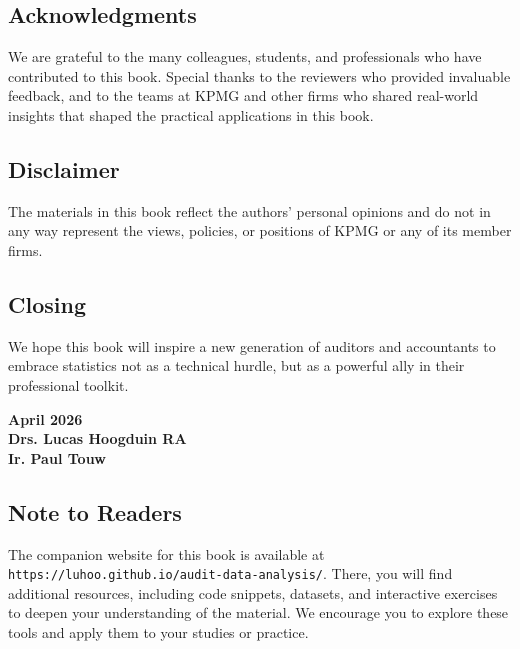 \documentclass[11pt]{memoir}
\theoremstyle{definition} %
\begin{document}
\subsection*{Acknowledgments}
We are grateful to the many colleagues, students, and professionals who have contributed to this book. Special thanks to the reviewers who provided invaluable feedback, and to the teams at KPMG and other firms who shared real-world insights that shaped the practical applications in this book.

\subsection*{Disclaimer}
The materials in this book reflect the authors' personal opinions and do not in any way represent the views, policies, or positions of KPMG or any of its member firms.

\subsection*{Closing}
We hope this book will inspire a new generation of auditors and accountants to embrace statistics not as a technical hurdle, but as a powerful ally in their professional toolkit.

\begin{flushright}
\textbf{April 2026}\\
\textbf{Drs. Lucas Hoogduin RA}\\
\textbf{Ir. Paul Touw}
\end{flushright}

\subsection*{Note to Readers}
The companion website for this book is available at \texttt{https://luhoo.github.io/audit-data-analysis/}. There, you will find additional resources, including code snippets, datasets, and interactive exercises to deepen your understanding of the material. We encourage you to explore these tools and apply them to your studies or practice.

\mainmatter




\printnomenclature
{}

\backmatter

% 
% 

\printindex
\end{document}
